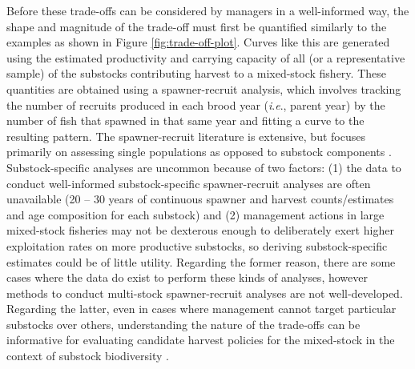 \documentclass[12pt,]{book}
\theoremstyle{definition}
\theoremstyle{definition}
\theoremstyle{definition}
\theoremstyle{remark}
\begin{document}
Before these trade-offs can be considered by managers in a well-informed
way, the shape and magnitude of the trade-off must first be quantified
similarly to the examples as shown in Figure \ref{fig:trade-off-plot}.
Curves like this are generated using the estimated productivity and
carrying capacity of all (or a representative sample) of the substocks
contributing harvest to a mixed-stock fishery. These quantities are
obtained using a spawner-recruit analysis, which involves tracking the
number of recruits produced in each brood year (\emph{i}.\emph{e}.,
parent year) by the number of fish that spawned in that same year and
fitting a curve to the resulting pattern. The spawner-recruit literature
is extensive, but focuses primarily on assessing single populations as
opposed to substock components \citep[but see the work on Skeena River,
British Columbia sockeye salmon \emph{O. nerka}
substocks;][]{korman-english-2013, walters-etal-2008}. Substock-specific
analyses are uncommon because of two factors: (1) the data to conduct
well-informed substock-specific spawner-recruit analyses are often
unavailable (20 -- 30 years of continuous spawner and harvest
counts/estimates and age composition for each substock) and (2)
management actions in large mixed-stock fisheries may not be dexterous
enough to deliberately exert higher exploitation rates on more
productive substocks, so deriving substock-specific estimates could be
of little utility. Regarding the former reason, there are some cases
where the data do exist to perform these kinds of analyses, however
methods to conduct multi-stock spawner-recruit analyses are not
well-developed. Regarding the latter, even in cases where management
cannot target particular substocks over others, understanding the nature
of the trade-offs can be informative for evaluating candidate harvest
policies for the mixed-stock in the context of substock biodiversity
\citep{walters-etal-2018}.
\end{document}

